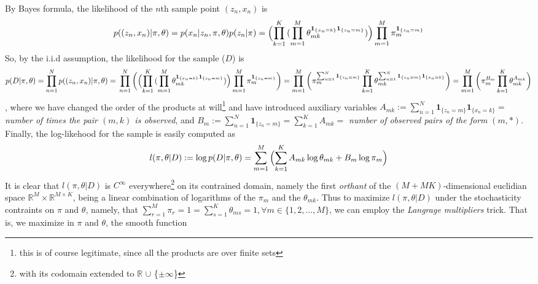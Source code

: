 \documentclass[9pt]{article}
\begin{document}
 By Bayes formula, the likelihood of the $n$th sample point $(z_{n}, x_{n})$ is
\begin{dmath}
p((z_{n}, x_{n}) | \pi, \theta) = p(x_{n} | z_{n}, \pi, \theta)p(z_{n} | \pi) = \Bigl(\prod_{k=1}^{K}{(\prod_{m=1}^{M}{\theta_{mk}^{\mathbf{1}_{\{x_{n} = k\}}\mathbf{1}_{\{z_{n} = m\}}}})\Bigr)}\prod_{m=1}^{M}{\pi_{m}^{\mathbf{1}_{\{z_{n} = m\}}}}
\end{dmath}
So, by the i.i.d assumption, the likelihood for the sample ($D$) is
\begin{dmath}
p(D | \pi, \theta) = \prod_{n=1}^{N}{p((z_{n}, x_{n}) | \pi, \theta)} = \\
 \prod_{n=1}^{N}{\biggl(\Bigl(\prod_{k=1}^{K}{(\prod_{m=1}^{M}{\theta_{mk}^{\mathbf{1}_{\{x_{n} = k\}}\mathbf{1}_{\{z_{n} = m\}}}})\Bigr)}\prod_{m=1}^{M}{\pi_{m}^{\mathbf{1}_{\{z_{n} = m\}}}}\biggr)} =
 \prod_{m=1}^{M}{\biggl(\pi_{m}^{\sum_{n=1}^{N}{{\mathbf{1}_{\{z_{n} = m\}}}}}\prod_{k=1}^{K}{\theta_{mk}^{\sum_{n=1}^{N}{\mathbf{1}_{\{z_{n} = m\}}\mathbf{1}_{\{x_{n} = k\}}}}}\biggr)} \\
= \prod_{m=1}^{M}{\biggl(\pi_{m}^{B_{m}}\prod_{k=1}^{K}{\theta_{mk}^{A_{mk}}}\biggr)}
\end{dmath},
where we have changed the order of the products at will\footnote{this is of course legitimate, since all the products are over finite sets}
 and have introduced auxiliary variables $A_{mk} := \sum_{n=1}^{N}{\mathbf{1}_{\{z_{n} = m\}}\mathbf{1}_{\{x_{n} = k\}}} =$ \textit{number of times the pair $(m, k)$ is observed}, and
 $B_{m} := \sum_{n=1}^{N}{\mathbf{1}_{\{z_{n} = m\}}} = \sum_{k=1}^{K}{A_{mk}} =$ \textit{number of observed pairs of the form }$(m, *)$.
Finally, the log-likehood for the sample is easily computed as
\begin{dmath}
l(\pi, \theta| D) := \log{p(D | \pi, \theta)} = \sum_{m=1}^{M}{\Bigl(\sum_{k=1}^{K}{A_{mk}\log{\theta_{mk}}} + B_{m}\log{\pi_{m}}\Bigr)}
\end{dmath}
It is clear that $l(\pi, \theta| D)$ is $C^{\infty}$ everywhere\footnote{with its codomain extended to $\mathbb{R}$ $\cup$ \{$\pm\infty$\}} on its contrained domain,
 namely the first \textit{orthant} of the $(M + MK)$-dimensional euclidian space $\mathbb{R}^{M} \times \mathbb{R}^{M \times K}$,
 being a linear combination of logarithms of the $\pi_{m}$ and the $\theta_{mk}$. Thus to maximize $l(\pi, \theta| D)$ under the stochasticity contraints on $\pi$ and
 $\theta$, namely, that $\sum_{r=1}^{M}{\pi_{r}} = 1 = \sum_{s=1}^{K}{\theta_{ms}} = 1, \forall m \in \{1, 2, ..., M\}$, we can employ the \textit{Langrage multipliers} trick. That is,  we maximize in $\pi$ and $\theta$, the smooth function
\end{document}
